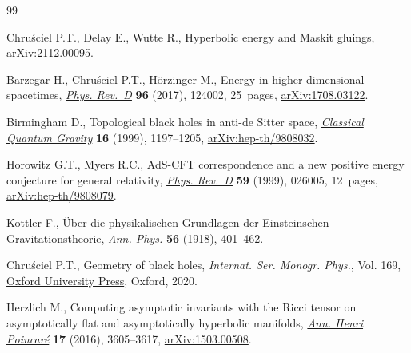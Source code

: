 \documentclass[10pt,a4paper]{article}
\numberwithin{equation}{section}
\begin{document}
\begin{thebibliography}{99}

Chru\'sciel P.T., Delay E., Wutte R., Hyperbolic energy and {M}askit gluings,
 \href{https://arxiv.org/abs/2112.00095}{arXiv:2112.00095}.


Barzegar H., Chru\'sciel P.T., H\"orzinger M., Energy in higher-dimensional
 spacetimes, \href{https://doi.org/10.1103/physrevd.96.124002}{\textit{Phys. Rev.~D}} \textbf{96} (2017), 124002, 25~pages,
 \href{https://arxiv.org/abs/1708.03122}{arXiv:1708.03122}.


Birmingham D., Topological black holes in anti-de {S}itter space,
 \href{https://doi.org/10.1088/0264-9381/16/4/009}{\textit{Classical Quantum Gravity}} \textbf{16} (1999), 1197--1205,
 \href{https://arxiv.org/abs/hep-th/9808032}{arXiv:hep-th/9808032}.


Horowitz G.T., Myers R.C., Ad{S}-{CFT} correspondence and a new positive energy
 conjecture for general relativity, \href{https://doi.org/10.1103/PhysRevD.59.026005}{\textit{Phys. Rev.~D}} \textbf{59} (1999),
 026005, 12~pages, \href{https://arxiv.org/abs/hep-th/9808079}{arXiv:hep-th/9808079}.


Kottler F., \"Uber die physikalischen Grundlagen der Einsteinschen
 Gravitationstheorie, \href{https://doi.org/10.1002/andp.19183611402}{\textit{Ann. Phys.}} \textbf{56} (1918), 401--462.


Chru\'sciel P.T., Geometry of black holes, \textit{Internat. Ser. Monogr.
 Phys.}, Vol. 169, \href{https://doi.org/10.1093/oso/9780198855415.001.0001}{Oxford University Press}, Oxford, 2020.


Herzlich M., Computing asymptotic invariants with the {R}icci tensor on
 asymptotically flat and asymptotically hyperbolic manifolds, \href{https://doi.org/10.1007/s00023-016-0494-5}{\textit{Ann.
 Henri Poincar\'e}} \textbf{17} (2016), 3605--3617, \href{https://arxiv.org/abs/1503.00508}{arXiv:1503.00508}.



\end{thebibliography}
\end{document}

